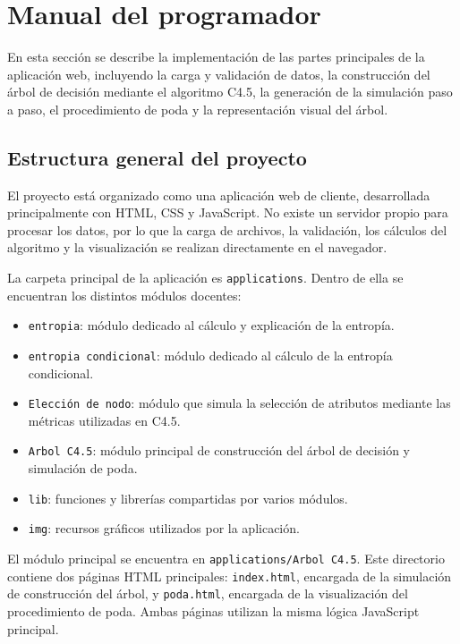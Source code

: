 \section{Manual del programador}

En esta sección se describe la implementación de las partes principales de la aplicación web, incluyendo la carga y validación de datos, la construcción del árbol de decisión mediante el algoritmo C4.5, la generación de la simulación paso a paso, el procedimiento de poda y la representación visual del árbol.

\subsection{Estructura general del proyecto}

El proyecto está organizado como una aplicación web de cliente, desarrollada principalmente con HTML, CSS y JavaScript. No existe un servidor propio para procesar los datos, por lo que la carga de archivos, la validación, los cálculos del algoritmo y la visualización se realizan directamente en el navegador.

La carpeta principal de la aplicación es \texttt{applications}. Dentro de ella se encuentran los distintos módulos docentes:

\begin{itemize}
    \item \texttt{entropia}: módulo dedicado al cálculo y explicación de la entropía.
    \item \texttt{entropia condicional}: módulo dedicado al cálculo de la entropía condicional.
    \item \texttt{Elección de nodo}: módulo que simula la selección de atributos mediante las métricas utilizadas en C4.5.
    \item \texttt{Arbol C4.5}: módulo principal de construcción del árbol de decisión y simulación de poda.
    \item \texttt{lib}: funciones y librerías compartidas por varios módulos.
    \item \texttt{img}: recursos gráficos utilizados por la aplicación.
\end{itemize}

El módulo principal se encuentra en \texttt{applications/Arbol C4.5}. Este directorio contiene dos páginas HTML principales: \texttt{index.html}, encargada de la simulación de construcción del árbol, y \texttt{poda.html}, encargada de la visualización del procedimiento de poda. Ambas páginas utilizan la misma lógica JavaScript principal.

